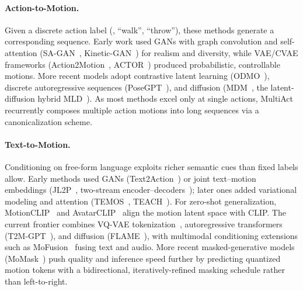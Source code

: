 \paragraph{Action-to-Motion.} Given a discrete action label (\eg, ``walk'', ``throw''), these methods generate a corresponding sequence. Early work used GANs with graph convolution and self-attention (SA-GAN~\cite{YuZLYC20}, Kinetic-GAN~\cite{DegardinNLBY022}) for realism and diversity, while VAE/CVAE frameworks (Action2Motion~\cite{GuoZWZSDG020}, ACTOR~\cite{PetrovichBV21}) produced probabilistic, controllable motions. More recent models adopt contrastive latent learning (ODMO~\cite{LuZLR22}), discrete autoregressive sequences (PoseGPT~\cite{LucasBWR22}), and diffusion (MDM~\cite{TevetRGSCB23}, the latent-diffusion hybrid MLD~\cite{ChenJLHFCY23}). As most methods excel only at single actions, MultiAct~\cite{LeeML23} recurrently composes multiple action motions into long sequences via a canonicalization scheme.

\paragraph{Text-to-Motion.} Conditioning on free-form language exploits richer semantic cues than fixed labels allow. Early methods used GANs (Text2Action~\cite{AhnHCYO18}) or joint text--motion embeddings (JL2P~\cite{AhujaM19}, two-stream encoder--decoders~\cite{GhoshCOTS21}); later ones added variational modeling and attention (TEMOS~\cite{PetrovichBV22}, TEACH~\cite{AthanasiouPBV22}).
For zero-shot generalization, MotionCLIP~\cite{TevetGHBC22} and AvatarCLIP~\cite{HongZPCYL22} align the motion latent space with CLIP.
The current frontier combines VQ-VAE tokenization~\cite{GuoZWC22}, autoregressive transformers (T2M-GPT~\cite{zhang2023generating}), and diffusion (FLAME~\cite{KimKC23}), with multimodal conditioning extensions such as MoFusion~\cite{DabralMGT23} fusing text and audio. More recent masked-generative models (MoMask~\cite{GuoMJW024}) push quality and inference speed further by predicting quantized motion tokens with a bidirectional, iteratively-refined masking schedule rather than left-to-right.

